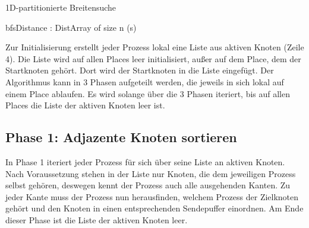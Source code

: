 \begin{algorithm}
	\caption{1D-partitionierte Breitensuche}
	\label{alg:1d_bfs_abstract}
	\begin{algorithmic}[1]
		\State bfsDistance : DistArray of size n 
			(s) 
					\EndFor
				\EndFor

					\EndIf
				\EndFor
			\EndWhile
		\EndFor
	\end{algorithmic}
\end{algorithm}

Zur Initialisierung erstellt jeder Prozess lokal eine Liste aus aktiven Knoten (Zeile 4). Die Liste wird auf allen Places leer initialisiert, außer auf dem Place, dem der Startknoten gehört. Dort wird der Startknoten in die Liste eingefügt. Der Algorithmus kann in 3 Phasen aufgeteilt werden, die jeweils in sich lokal auf einem Place ablaufen. Es wird solange über die 3 Phasen iteriert, bis auf allen Places die Liste der aktiven Knoten leer ist.

\subsection{Phase 1: Adjazente Knoten sortieren} %
\label{sub:phase_1}
In Phase 1 iteriert jeder Prozess für sich über seine Liste an aktiven Knoten. Nach Voraussetzung stehen in der Liste nur Knoten, die dem jeweiligen Prozess selbst gehören, deswegen kennt der Prozess auch alle ausgehenden Kanten. Zu jeder Kante muss der Prozess nun herausfinden, welchem Prozess der Zielknoten gehört und den Knoten in einen entsprechenden Sendepuffer einordnen. Am Ende dieser Phase ist die Liste der aktiven Knoten leer.

